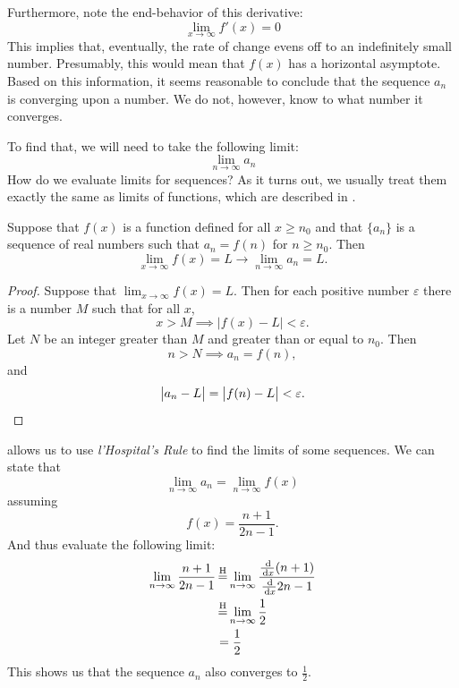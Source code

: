 \begin{ex}
    Furthermore, note the end-behavior of this derivative:
    \[ \lim_{x \to \infty} f'(x) = 0 \]
    This implies that, eventually, the rate of change evens off to an indefinitely small number.
    Presumably, this would mean that \(f(x)\) has a horizontal asymptote.
    Based on this information, it seems reasonable to conclude that the sequence \(a_n\) is converging upon a number.
    We do not, however, know to what number it converges.

    To find that, we will need to take the following limit:
    \[ \lim_{n\to\infty} a_n \]
    How do we evaluate limits for sequences? As it turns out, we usually treat
    them exactly the same as limits of functions, which are described in .
    \begin{theorem}\label{th:inftyanlimit}
      Suppose that \(f(x)\) is a function defined for all \( x \geq n_0\) and
      that \( \{a_n\} \) is a sequence of real numbers such that \(a_n = f(n)\)
      for \(n \geq n_0\). Then
      \[ \lim_{x \to \infty} f(x) = L \to \lim_{n \to \infty} a_n = L\text{.} \]
      \begin{proof}
        Suppose that \( \lim_{x \to \infty} f(x) = L \). Then for each positive
        number \( \varepsilon \) there is a number \( M \) such that for all
        \(x\),
        \[ x > M \implies \big| f(x) - L \big| < \varepsilon. \]
        Let \(N\) be an integer greater than \(M\) and greater than or equal to
        \(n_0\). Then
        \[ n > N \implies a_n = f(n),\]
        and
        \[\big|a_n -L \big| = \big|f(n) - L\big| < \varepsilon. \qedhere\]
        \cite[p. 537]{thomas}%
      \end{proof}
    \end{theorem}
     allows us to use \emph{l'Hospital's Rule} to find the limits of some
    sequences. We can state that
    \[\lim_{n\to\infty} a_n =\lim_{n\to\infty}f(x)\]
    assuming
    \[f(x)=\frac{n+1}{2n-1}\text{.}\]
    And thus evaluate the following limit:
    \begin{align*}
      \lim_{n\to\infty} \frac{n+1}{2n-1}
      &\=H \lim_{n\to\infty} \dfrac{\frac{\ud}{\ud x}(n+1)}{\frac{\ud}{\ud x}2n-1} \\
      &\=H \lim_{n\to\infty} \frac{1}{2} \\
      &= \frac{1}{2}
    \end{align*}
    This shows us that the sequence $a_n$ also converges to \(\frac{1}{2}\).
    \begin{figure}[H]

\end{figure}
\end{ex}
